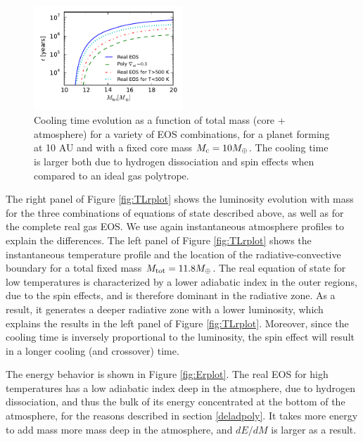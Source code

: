 \documentclass[apj]{emulateapj}
\begin{document}
\begin{figure}[h]
\centering
\includegraphics[width=0.5\textwidth]{../../figs/ModelAtmospheres/RadSelfGravRealEOS/EOSeffects/tplot.pdf}
\caption{Cooling time evolution as a function of total mass (core + atmosphere) for a variety of EOS combinations, for a planet forming at 10 AU and with a fixed core mass $M_{\rm c}=10 M_{\oplus}$. The cooling time is larger both due to hydrogen dissociation and spin effects when compared to an ideal gas polytrope.}
\label{fig:tplotall}
\end{figure}


The right panel of Figure \ref{fig:TLrplot} shows the luminosity evolution with mass for the three combinations of equations of state described above, as well as for the complete real gas EOS. We use again instantaneous atmosphere profiles to explain the differences. The left panel of Figure \ref{fig:TLrplot} shows the instantaneous temperature profile and the location of the radiative-convective boundary for a total fixed mass $M_{\rm{tot}}=11.8 M_{\oplus}$. The real equation of state for low temperatures is characterized by a lower adiabatic index in the outer regions, due to the spin effects, and is therefore dominant in the radiative zone. As a result, it generates a deeper radiative zone with a lower luminosity, which explains the results in the left panel of Figure \ref{fig:TLrplot}. Moreover, since the cooling time is inversely proportional to the luminosity, the spin effect will result in a longer cooling (and crossover) time.

The energy behavior is shown in Figure \ref{fig:Erplot}. The real EOS for high temperatures has a low adiabatic index deep in the atmosphere, due to hydrogen dissociation, and thus the bulk of its energy concentrated at the bottom of the atmosphere, for the reasons described in section \ref{deladpoly}. It takes more energy to add mass more mass deep in the atmosphere, and $dE/dM$ is larger as a result. 
%
\end{document}

